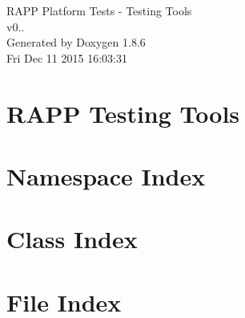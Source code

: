 \documentclass[twoside]{book}
\newcommand{\clearemptydoublepage}{%
  \newpage{\pagestyle{empty}\cleardoublepage}%
}
\begin{document}
\hypersetup{pageanchor=false}
\begin{titlepage}
\vspace*{7cm}
\begin{center}%
{\Large R\-A\-P\-P Platform Tests -\/ Testing Tools \\[1ex]\large v0.. }\\
\vspace*{1cm}
{\large Generated by Doxygen 1.8.6}\\
\vspace*{0.5cm}
{\small Fri Dec 11 2015 16:03:31}\\
\end{center}
\end{titlepage}
\clearemptydoublepage
\tableofcontents
\clearemptydoublepage
{}
\hypersetup{pageanchor=true}

\chapter{R\-A\-P\-P Testing Tools}
\label{md__home_travis_rapp_temp_rapp-platform_rapp_testing_tools_README}
\hypertarget{md__home_travis_rapp_temp_rapp-platform_rapp_testing_tools_README}{}

\chapter{Namespace Index}

\chapter{Class Index}

\chapter{File Index}

\end{document}
